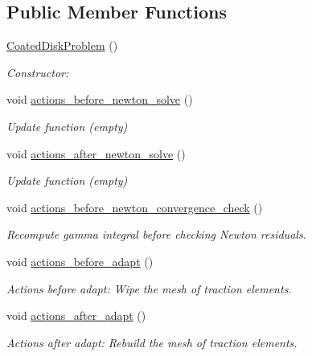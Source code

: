 \subsection*{Public Member Functions}
\begin{DoxyCompactItemize}
\item 
\hyperlink{classCoatedDiskProblem_a9585ca5b422c72dc2b91cbb3e311b736}{Coated\+Disk\+Problem} ()
\begin{DoxyCompactList}\small\item\em Constructor\+: \end{DoxyCompactList}\item 
void \hyperlink{classCoatedDiskProblem_a3b94aaddee6a8f386ba249f418813963}{actions\+\_\+before\+\_\+newton\+\_\+solve} ()
\begin{DoxyCompactList}\small\item\em Update function (empty) \end{DoxyCompactList}\item 
void \hyperlink{classCoatedDiskProblem_aa0b9b4e706cdb1b31738c3db8759e9ee}{actions\+\_\+after\+\_\+newton\+\_\+solve} ()
\begin{DoxyCompactList}\small\item\em Update function (empty) \end{DoxyCompactList}\item 
void \hyperlink{classCoatedDiskProblem_a8f52f13933fba3b053d50de544d8cafc}{actions\+\_\+before\+\_\+newton\+\_\+convergence\+\_\+check} ()
\begin{DoxyCompactList}\small\item\em Recompute gamma integral before checking Newton residuals. \end{DoxyCompactList}\item 
void \hyperlink{classCoatedDiskProblem_a89e972df172b024b1358f0fac7646d6d}{actions\+\_\+before\+\_\+adapt} ()
\begin{DoxyCompactList}\small\item\em Actions before adapt\+: Wipe the mesh of traction elements. \end{DoxyCompactList}\item 
void \hyperlink{classCoatedDiskProblem_a93f9d34cd24f08ca1ec726ae0057b939}{actions\+\_\+after\+\_\+adapt} ()
\begin{DoxyCompactList}\small\item\em Actions after adapt\+: Rebuild the mesh of traction elements. \end{DoxyCompactList}\item 

\end{DoxyCompactItemize}

